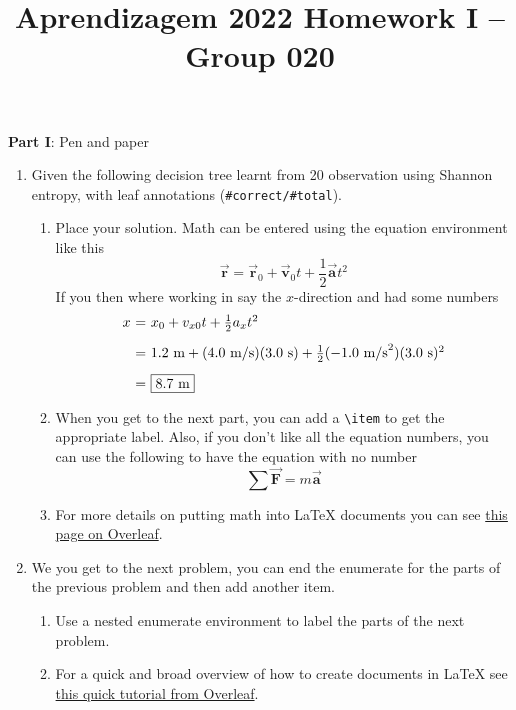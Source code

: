 \documentclass[12pt]{article}
\title{\large{Aprendizagem 2022}\vskip 0.2cm Homework I -- Group 020}
\date{}
\begin{document}
\maketitle
\center\large{\vskip -2.5cm\textbf{Part I}: Pen and paper}
\begin{enumerate}[leftmargin=\labelsep]
\item Given the following decision tree learnt from 20 observation using Shannon entropy, with leaf annotations (\texttt{\#correct/\#total}).
    \begin{enumerate}
    \item Place your solution. Math can be entered using the equation
    environment like this
    \begin{equation}
        \vec{\mathbf{r}} = \vec{\mathbf{r}}_{0} + \vec{\mathbf{v}}_{0}t + \frac{1}{2}\vec{\mathbf{a}}t^{2}
    \end{equation}
    If you then where working in say the $x$-direction and had some numbers %
    \begin{equation}
    \begin{array}{r@{~=~}l}
    x & x_{0} + v_{x0}t + \frac{1}{2}a_{x}t^{2} \\ [2ex]
    & 1.2~\text{m} + (4.0~\text{m/s})(3.0~\text{s}) + \frac{1}{2}(-1.0~\text{m/s}^{2})(3.0~\text{s})^{2}\\ [2ex]
    & \boxed{8.7~\text{m}}
    \end{array}
    \end{equation}

    \item When you get to the next part, you can add a \verb"\item" to get the appropriate label. Also,
    if you don't like all the equation numbers, you can use the following to have the equation with
    no number
    \begin{equation*}
    \sum\vec{\mathbf{F}} = m\vec{\mathbf{a}}
    \end{equation*}

    \item For more details on putting math into {\LaTeX} documents you can see 
    \href{https://www.overleaf.com/learn/latex/Mathematical_expressions}{this page on Overleaf}.
    \end{enumerate}

\item We you get to the next problem, you can end the enumerate for the parts of the previous problem and then add another item.
    \begin{enumerate}
    \item Use a nested enumerate environment to label the parts of the next problem.
    \item For a quick and broad overview of how to create documents in {\LaTeX} see 
    \href{https://www.overleaf.com/learn/latex/Learn_LaTeX_in_30_minutes}{this quick tutorial from Overleaf}.
    \end{enumerate}
\end{enumerate}
\end{document}

